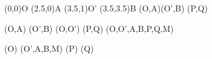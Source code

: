 \tkzDefPoint(0,0){O}
\tkzDefPoint(2.5,0){A}
\tkzDefPoint(3.5,1){O'}
\tkzDefPoint(3.5,3.5){B}
\tkzInterCC(O,A)(O',B) 
\tkzDefMidPoint(P,Q) 

\tkzDrawCircle(O,A)
\tkzDrawCircle(O',B)
\tkzDrawLine(O,O')
\tkzDrawSegment(P,Q)
\tkzDrawPoints(O,O',A,B,P,Q,M)

(O)
(O',A,B,M)
\tkzLabelPoints[above](P)
\tkzLabelPoints[below](Q)
